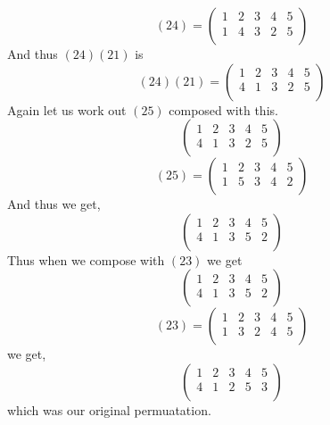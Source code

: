 \begin{equation*}
    (24) = 
 \begin{pmatrix}
  1 & 2 & 3 & 4 & 5  \\
  1 & 4 & 3 & 2 & 5  \\
 \end{pmatrix}
\end{equation*}
And thus $(24)(21)$ is 
\begin{equation*}
    (24)(21) = 
 \begin{pmatrix}
  1 & 2 & 3 & 4 & 5  \\
  4 & 1 & 3 & 2 & 5  \\
 \end{pmatrix}
\end{equation*}
Again let us work out  $(25)$ composed with this.
\begin{equation*}
 \begin{pmatrix}
  1 & 2 & 3 & 4 & 5  \\
  4 & 1 & 3 & 2 & 5  \\
 \end{pmatrix}
\end{equation*}
\begin{equation*}
    (25) = 
 \begin{pmatrix}
  1 & 2 & 3 & 4 & 5  \\
  1 & 5 & 3 & 4 & 2  \\
 \end{pmatrix}
\end{equation*}
And thus we get,
\begin{equation*}
 \begin{pmatrix}
  1 & 2 & 3 & 4 & 5  \\
  4 & 1 & 3 & 5 & 2  \\
 \end{pmatrix}
\end{equation*}
Thus when we compose with $(23)$ we get
\begin{equation*}
 \begin{pmatrix}
  1 & 2 & 3 & 4 & 5  \\
  4 & 1 & 3 & 5 & 2  \\
 \end{pmatrix}
\end{equation*}
\begin{equation*}
    (23) = 
 \begin{pmatrix}
  1 & 2 & 3 & 4 & 5  \\
  1 & 3 & 2 & 4 & 5  \\
 \end{pmatrix}
\end{equation*}
we get,
\begin{equation*}
 \begin{pmatrix}
  1 & 2 & 3 & 4 & 5  \\
  4 & 1 & 2 & 5 & 3  \\
 \end{pmatrix}
\end{equation*}
which was our original permuatation.

